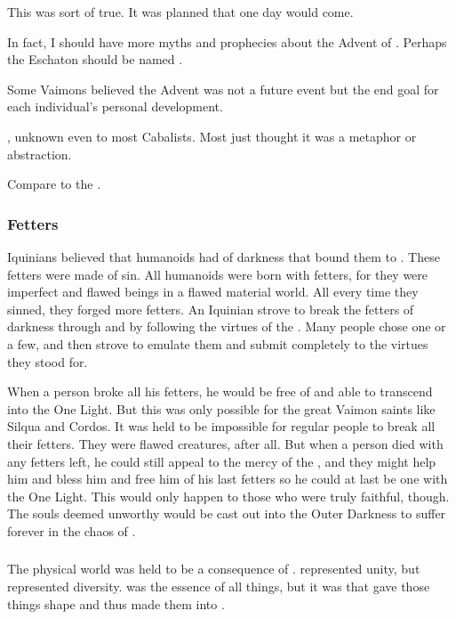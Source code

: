 This was sort of true. 
It was planned that one day  would come. 

In fact, I should have more myths and prophecies about the Advent of \Lithrim. 
Perhaps the Eschaton should be named .
 
Some Vaimons believed the Advent was not a future event but the end goal for each individual's personal development. 

, unknown even to most Cabalists. 
Most just thought it was a metaphor or abstraction. 

Compare to the . 





\subsubsection{Fetters}
Iquinians believed that humanoids had  of darkness that bound them to \itzach. 
These fetters were made of sin. 
All humanoids were born with fetters, for they were imperfect and flawed beings in a flawed material world. 
All every time they sinned, they forged more fetters. 
An Iquinian strove to break the fetters of darkness through  and by following the virtues of the \sephiroth. 
Many people chose one \sephirah or a few, and then strove to emulate them and submit completely to the virtues they stood for. 

When a person broke all his fetters, he would be free of \itzach and able to transcend into the One Light. 
But this was only possible for the great Vaimon saints like Silqua and Cordos. 
It was held to be impossible for regular people to break all their fetters. 
They were flawed creatures, after all.
But when a person died with any fetters left, he could still appeal to the mercy of the \sephiroth, and they might help him and bless him and free him of his last fetters so he could at last be one with the One Light. 
This would only happen to those who were truly faithful, though. 
The souls deemed unworthy would be cast out into the Outer Darkness to suffer forever in the chaos of \itzach.






\subsubsection{\Gehinnom}
The physical world was held to be a consequence of \itzach. 
\Iquin represented unity, but \itzach represented diversity. 
\Iquin was the essence of all things, but it was \itzach that gave those things shape and thus made them into .

